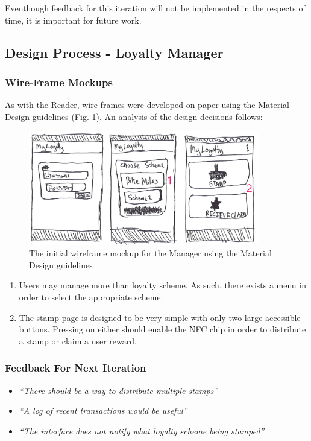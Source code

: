 Eventhough feedback for this iteration will not be implemented in the respects of time, it is important for future work.

\newpage
\subsection{Design Process - Loyalty Manager}
\subsubsection{Wire-Frame Mockups}
As with the Reader, wire-frames were developed on paper using the Material Design guidelines (Fig. \ref{fig:wireframem1}). An analysis of the design decisions follows: 
\begin{figure}[H]
 \centering
  \includegraphics[width=0.9\textwidth]{img/page2.jpg}
    \caption{The initial wireframe mockup for the Manager using the Material Design guidelines}
         \label{fig:wireframem1}
\end{figure}


\begin{enumerate}
  \item Users may manage more than loyalty scheme. As such, there exists a menu in order to select the appropriate scheme.
  \item The stamp page is designed to be very simple with only two large accessible buttons. Pressing on either should enable the NFC chip in order to distribute a stamp or claim a user reward.
\end{enumerate}

\subsubsection{Feedback For Next Iteration}
\begin{itemize}
  \item \textit{``There should be a way to distribute multiple stamps''}
  \item \textit{``A log of recent transactions would be useful''}
  \item \textit{``The interface does not notify what loyalty scheme being stamped''}
\end{itemize}


